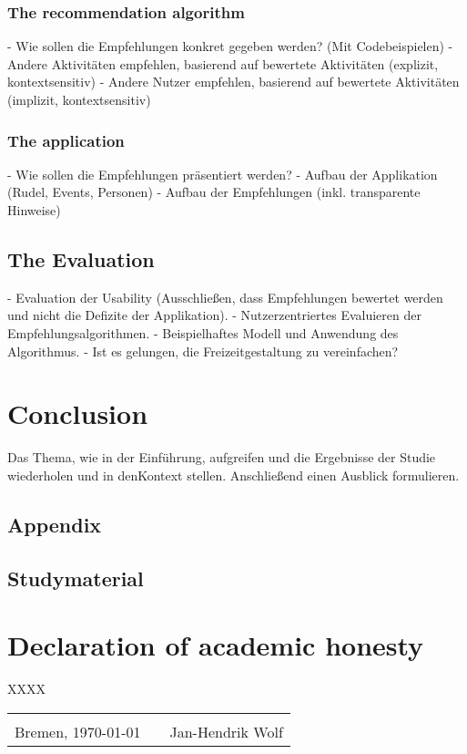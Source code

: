 \documentclass[12pt,numbers=noenddot,parskip,bibliography=totocnumbered,listof=totocnumbered]{scrreprt}
\begin{document}
\subsection{The recommendation algorithm}
- Wie sollen die Empfehlungen konkret gegeben werden? (Mit Codebeispielen)
	- Andere Aktivitäten empfehlen, basierend auf bewertete Aktivitäten (explizit, kontextsensitiv)
	- Andere Nutzer empfehlen, basierend auf bewertete Aktivitäten (implizit, kontextsensitiv)
\subsection{The application}
- Wie sollen die Empfehlungen präsentiert werden?
	- Aufbau der Applikation (Rudel, Events, Personen)
	- Aufbau der Empfehlungen (inkl. transparente Hinweise)
\section{The Evaluation}
- Evaluation der Usability (Ausschließen, dass Empfehlungen bewertet werden und nicht die Defizite der Applikation).
- Nutzerzentriertes Evaluieren der Empfehlungsalgorithmen.
- Beispielhaftes Modell und Anwendung des Algorithmus.
- Ist es gelungen, die Freizeitgestaltung zu vereinfachen?

\chapter{Conclusion}
Das Thema, wie in der Einführung, aufgreifen und die Ergebnisse der Studie wiederholen und in denKontext stellen. Anschließend einen Ausblick formulieren.

\begin{appendix} 
\chapter{Appendix}
\newpage
\section{Studymaterial}
\vspace*{\fill}
\label{lab:Studymaterial}
\vspace*{\fill}
\end{appendix}

\clearpage
{}



\listoffigures

\chapter*{Declaration of academic honesty}
\thispagestyle{empty}
XXXX
\begin{center}
\begin{tabular}{lp{2em}l} 
 \hspace{5cm}   && \hspace{4cm} \\\cline{1-1}\cline{3-3} 
 Bremen, \today    && Jan-Hendrik Wolf 
\end{tabular} 
\end{center}
\end{document}
